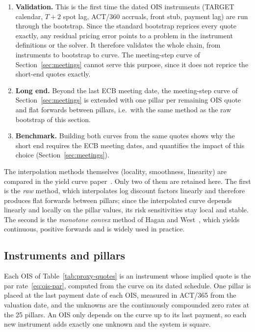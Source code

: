 \documentclass[11pt,a4paper]{article}
\theoremstyle{plain}
\theoremstyle{definition}
\begin{document}
\begin{enumerate}[label=(\roman*)]
    \item \textbf{Validation.} This is the first time the dated OIS
    instruments (TARGET calendar, $T+2$ spot lag, ACT/360 accruals, front
    stub, payment lag) are run through the bootstrap. Since the standard
    bootstrap reprices every quote exactly, any residual pricing error points
    to a problem in the instrument definitions or the solver. It therefore
    validates the whole chain, from instruments to bootstrap to curve. The
    meeting-step curve of Section~\ref{sec:meetings} cannot serve this
    purpose, since it does not reprice the short-end quotes exactly.

    \item \textbf{Long end.} Beyond the last ECB meeting date, the
    meeting-step curve of Section~\ref{sec:meetings} is extended with one
    pillar per remaining OIS quote and flat forwards between pillars, i.e.\
    with the same method as the raw bootstrap of this section.

    \item \textbf{Benchmark.} Building both curves from the same quotes shows
    why the short end requires the ECB meeting dates, and quantifies the
    impact of this choice (Section~\ref{sec:meetings}).
\end{enumerate}

The interpolation methods themselves (locality, smoothness, linearity) are
compared in the yield curve paper~\cite{yieldcurve}. Only two of them are
retained here. The first is the \emph{raw} method, which interpolates log
discount factors linearly and therefore produces flat forwards between
pillars; since the interpolated curve depends linearly and locally on the
pillar values, its risk sensitivities stay local and stable. The second is
the \emph{monotone convex} method of Hagan and West~\cite{haganwest2006},
which yields continuous, positive forwards and is widely used in practice.

\subsection{Instruments and pillars}
Each OIS of Table~\ref{tab:proxy-quotes} is an instrument whose implied quote is the par rate~\eqref{eq:ois-par}, computed from the curve on its dated schedule. One pillar is placed at the last payment date of each OIS, measured in ACT/365 from the valuation date, and the unknowns are the continuously compounded zero rates at the 25 pillars. An OIS only depends on the curve up to its last payment, so each new instrument adds exactly one unknown and the system is square.
\end{document}
